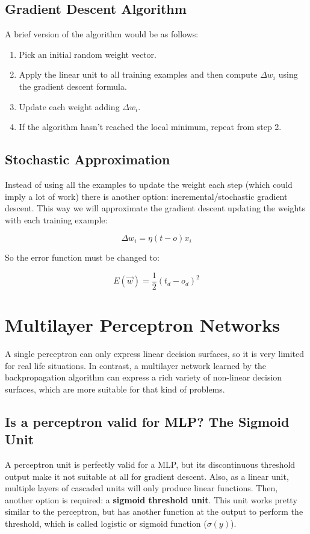 	\subsection{Gradient Descent Algorithm}
	A brief version of the algorithm would be as follows:

	\begin{enumerate}

		\item Pick an initial random weight vector.
		\item Apply the linear unit to all training examples and then compute $\Delta w_i$  using the gradient descent formula.
		\item Update each weight adding $\Delta w_i$.
		\item If the algorithm hasn’t reached the local minimum, repeat from step 2.
	
	\end{enumerate}

	\subsection{Stochastic Approximation}
	Instead of using all the examples to update the weight each step (which could imply a lot of work) there is another option: incremental/stochastic gradient descent. This way we will approximate the gradient descent updating the weights with each training example:

	\begin{equation}
		\label{delta_rule}
		\Delta w_{i}= \eta (t - o) x_{i}
	\end{equation}

	So the error function must be changed to:

	\begin{equation}
		\label{error_function_stoc_square}
		E(\vec{w}) = \frac{1}{2} (t_d-o_d)^2 
	\end{equation}

\section{Multilayer Perceptron Networks}
A single perceptron can only express linear decision surfaces, so it is very limited for real life situations. In contrast, a multilayer network learned by the backpropagation algorithm can express a rich variety of non-linear decision surfaces, which are more suitable for that kind of problems.

	\subsection{Is a perceptron valid for MLP? The Sigmoid Unit}
	A perceptron unit is perfectly valid for a MLP, but its discontinuous threshold output make it not suitable at all for gradient descent. Also, as a linear unit, multiple layers of cascaded units will only produce linear functions. Then, another option is required: a \textbf{sigmoid threshold unit}. This unit works pretty similar to the perceptron, but has another function at the output to perform the threshold, which is called logistic or sigmoid function ($\sigma(y)$).

